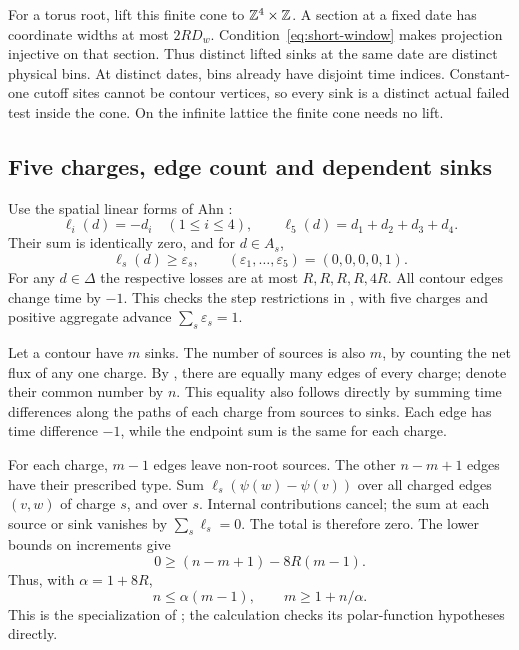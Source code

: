 For a torus root, lift this finite cone to \(\mathbb Z^4\times\mathbb Z\).
A section at a fixed date has coordinate widths at most \(2RD_w\).
Condition~\eqref{eq:short-window} makes projection injective on that
section. Thus distinct lifted sinks at the same date are distinct
physical bins. At distinct dates, bins already have disjoint time
indices. Constant-one cutoff sites cannot be contour vertices, so
every sink is a distinct actual failed test inside the cone. On
the infinite lattice the finite cone needs no lift.

\subsection{Five charges, edge count and dependent sinks}

Use the spatial linear forms of Ahn \cite[Eq.~(7.17)]{Ahn}:
\begin{equation}\label{eq:polar}
 \ell_i(d)=-d_i\quad(1\le i\le4),\qquad
 \ell_5(d)=d_1+d_2+d_3+d_4.
\end{equation}
Their sum is identically zero, and for \(d\in A_s\),
\[
 \ell_s(d)\ge\varepsilon_s,\qquad
       (\varepsilon_1,\ldots,\varepsilon_5)=(0,0,0,0,1).
\]
For any \(d\in\Delta\) the respective losses are at most
\(R,R,R,R,4R\). All contour edges change time by \(-1\).
This checks the step restrictions in \cite[Eq.~(5.7)]{SST}, with
five charges and positive aggregate advance
\(\sum_s\varepsilon_s=1\).

Let a contour have \(m\) sinks. The number of sources is also \(m\),
by counting the net flux of any one charge. By
\cite[Lemma 38, Eq.~(5.12)]{SST}, there are equally many edges of every
charge; denote their common number by \(n\).
This equality also follows directly by summing time differences
along the paths of each charge from sources to sinks. Each edge
has time difference \(-1\), while the endpoint sum is the same for
each charge.

For each charge, \(m-1\) edges leave non-root sources. The other
\(n-m+1\) edges have their prescribed type. Sum
\(\ell_s(\psi(w)-\psi(v))\) over all charged edges \((v,w)\) of charge
\(s\), and over \(s\). Internal contributions cancel; the sum at
each source or sink vanishes by \(\sum_s\ell_s=0\). The total is
therefore zero. The lower bounds on increments give
\[
 0\ge (n-m+1)-8R(m-1).
\]
Thus, with \(\alpha=1+8R\),
\begin{equation}\label{eq:edges-sinks}
 n\le\alpha(m-1),\qquad m\ge1+n/\alpha .
\end{equation}
This is the specialization of \cite[Lemma 40]{SST}; the calculation
checks its polar-function hypotheses directly.

